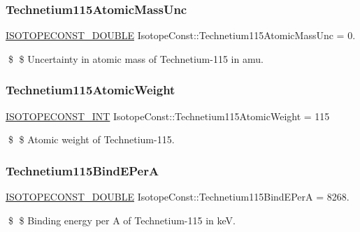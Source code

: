\subsubsection{\texorpdfstring{Technetium115\+Atomic\+Mass\+Unc}{Technetium115AtomicMassUnc}}
{\footnotesize\ttfamily \mbox{\hyperlink{group___isotope_const-_macros_ga8f45a7272ce02c0b4c65c44636ed719a}{I\+S\+O\+T\+O\+P\+E\+C\+O\+N\+S\+T\+\_\+\+D\+O\+U\+B\+LE}} Isotope\+Const\+::\+Technetium115\+Atomic\+Mass\+Unc = 0.}

\$ \$ Uncertainty in atomic mass of Technetium-\/115 in amu. \mbox{\label{group___isotope_const-_technetium-_tc115_gac10cfa21a1fa81769ac1ea762165b5f2}} 
\subsubsection{\texorpdfstring{Technetium115\+Atomic\+Weight}{Technetium115AtomicWeight}}
{\footnotesize\ttfamily \mbox{\hyperlink{group___isotope_const-_macros_ga5f18360b3e99483a35c32d789e62621c}{I\+S\+O\+T\+O\+P\+E\+C\+O\+N\+S\+T\+\_\+\+I\+NT}} Isotope\+Const\+::\+Technetium115\+Atomic\+Weight = 115}

\$ \$ Atomic weight of Technetium-\/115. \mbox{\label{group___isotope_const-_technetium-_tc115_ga145e21288cfaefc792079328df9c9a35}} 
\subsubsection{\texorpdfstring{Technetium115\+Bind\+E\+PerA}{Technetium115BindEPerA}}
{\footnotesize\ttfamily \mbox{\hyperlink{group___isotope_const-_macros_ga8f45a7272ce02c0b4c65c44636ed719a}{I\+S\+O\+T\+O\+P\+E\+C\+O\+N\+S\+T\+\_\+\+D\+O\+U\+B\+LE}} Isotope\+Const\+::\+Technetium115\+Bind\+E\+PerA = 8268.}

\$ \$ Binding energy per A of Technetium-\/115 in keV. \mbox{\label{group___isotope_const-_technetium-_tc115_ga80f50ea2ebb742d1a824a19d899a0169}} 
